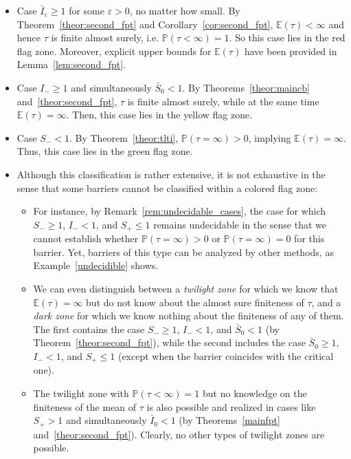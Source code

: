 \documentclass[12pt]{article}
\theoremstyle{definition}
\begin{document}
\begin{itemize}
\item Case $\bar{I}_\varepsilon \ge 1$ for some $\varepsilon>0$, no matter how small. By Theorem~\ref{theor:second_fpt} and Corollary~\ref{cor:second_fpt}, $\mathbb{E}(\tau)<\infty$ and hence $\tau$ is finite almost surely, i.e. $\mathbb{P}(\tau<\infty)=1$. So this case lies in the red flag zone. Moreover, explicit upper bounds for $\mathbb{E}(\tau)$ have been provided in Lemma~\ref{lem:second_fpt}.

\item Case $I_- \ge 1$ and simultaneously $\bar{S}_0 < 1$. By Theorems~\ref{theor:maincb} and~\ref{theor:second_fpt}, $\tau$ is finite almost surely, while at the same time $\mathbb{E}(\tau)=\infty$. Then, this case lies in the yellow flag zone.

\item Case $S_- < 1$. By Theorem~\ref{theor:tlti}, $\mathbb{P}(\tau = \infty)>0$, implying $\mathbb{E}(\tau)=\infty$. Thus, this case lies in the green flag zone.

\item Although this classification is rather extensive, it is not exhaustive in the sense that some barriers cannot be classified within a colored flag zone:

\begin{itemize}
\item For instance, by Remark~\ref{rem:undecidable_cases}, the case for which $S_- \ge 1$, $I_- < 1$, and $S_+ \le 1$ remains undecidable in the sense that we cannot establish whether $\mathbb{P}(\tau = \infty)>0$ or $\mathbb{P}(\tau = \infty)=0$ for this barrier. Yet, barriers of this type can be analyzed by other methods, as Example~\ref{undecidible} shows.

\item We can even distinguish between a {\it twilight zone} for which we know that $\mathbb{E}(\tau)=\infty$ but do not know about the almost sure finiteness of $\tau$, and a {\it dark zone} for which we know nothing about the finiteness of any of them. The first contains the case $S_- \ge 1$, $I_- < 1$, and $\bar{S}_0 < 1$ (by Theorem~\ref{theor:second_fpt}), while the second includes the case $\bar{S}_0 \ge 1$, $I_- < 1$, and $S_+ \le 1$ (except when the barrier coincides with the critical one).

\item The twilight zone with $\mathbb{P}(\tau<\infty)=1$ but no knowledge on the finiteness of the mean of $\tau$ is also possible and realized in cases like $S_+>1$ and simultaneously $\bar{I}_0 < 1$ (by Theorems~\ref{mainfpt} and~\ref{theor:second_fpt}). Clearly, no other types of twilight zones are possible.
\end{itemize}
\end{itemize}
\end{document}
